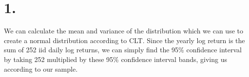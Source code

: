 \documentclass{article}
\begin{document}
\thispagestyle{firstpageheader}

\section*{1.}
{\Large 



We can calculate the mean and variance of the distribution which we can use to create a normal distribution according to CLT. Since the yearly log return is the sum of 252 iid daily log returns, we can simply find the 95\% confidence interval by taking 252 multiplied by these 95\% confidence interval bands, giving us  according to our sample.

}
\end{document}
